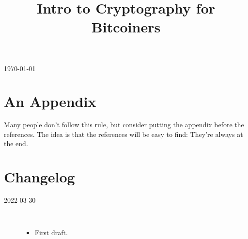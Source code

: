 \documentclass[
  a4paper,
  orivec,oribibl]{llncs}
\title{\texorpdfstring{%
    Intro to Cryptography for Bitcoiners%
  }{%
    Intro to Cryptography for Bitcoiners%
  }
}
\author{\texorpdfstring{%
      Alice Author\inst{1}\orcidID{0000-0000-0000-0000}
      \and Bob Author\inst{2}\orcidID{0000-0000-0000-0000}
    }{%
      Alice Author;
      Bob Author
    }}
\institute{%
    Some Institute
    \and Some University
  }
\author{\vspace{-4ex}}\institute{}
\begin{document}
\maketitle
\iffull
  \begin{center}
    \today
  \end{center}
\fi

\begin{abstract}
  
\end{abstract}

\ifcameraready
\fi

\iffull
  \tableofcontents
  \clearpage
\fi

% 





\appendix
{}

\section{An Appendix}\label{sec:test-appendix}
Many people don't follow this rule, but consider putting the appendix before the references.
The idea is that the references will be easy to find: They're always at the end.


\iffull

  \section*{Changelog}\label{sec:changelog}
  \begin{description}
    \item[2022-03-30]\
          \begin{itemize}
            \item First draft.
          \end{itemize}
  \end{description}
  \vspace{-2em}
\fi

{}
\printbibliography\label{sec:bib}
\end{document}
